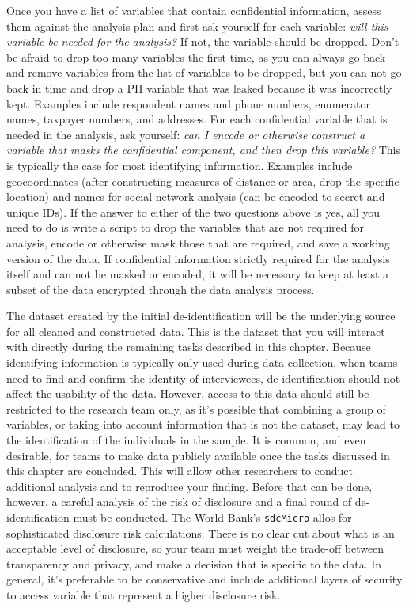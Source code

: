 Once you have a list of variables that contain confidential information,
assess them against the analysis plan and first ask yourself for each variable:
\textit{will this variable be needed for the analysis?}
If not, the variable should be dropped.
Don't be afraid to drop too many variables the first time,
as you can always go back and remove variables from the list of variables to be dropped,
but you can not go back in time and drop a PII variable that was leaked
because it was incorrectly kept.
Examples include respondent names and phone numbers, enumerator names, taxpayer 
numbers, and addresses.
For each confidential variable that is needed in the analysis, ask yourself:
\textit{can I encode or otherwise construct a variable that masks the confidential component, and
	then drop this variable?}
This is typically the case for most identifying information.
Examples include geocoordinates
(after constructing measures of distance or area,
drop the specific location)
and names for social network analysis (can be encoded to secret and unique IDs).
If the answer to either of the two questions above is yes,
all you need to do is write a script to drop the variables that are not required for analysis,
encode or otherwise mask those that are required,
and save a working version of the data.
If confidential information strictly required for the analysis itself and can not be
masked or encoded,
it will be necessary to keep at least a subset of the data encrypted through
the data analysis process.

The dataset created by the initial de-identification will be the underlying source for all cleaned and constructed data.
This is the dataset that you will interact with directly during the remaining tasks described in this chapter.
Because identifying information is typically only used during data collection,
when teams need to find and confirm the identity of interviewees,
de-identification should not affect the usability of the data.
However, access to this data should still be restricted to the research team only,
as it's possible that combining a group of variables,
or taking into account information that is not the dataset,
may lead to the identification of the individuals in the sample.
It is common, and even desirable, for teams to make data publicly available
once the tasks discussed in this chapter are concluded.
This will allow other researchers to conduct additional analysis and to reproduce your finding.
Before that can be done, however,
a careful analysis of the risk of disclosure and a final round of de-identification must be conducted.
The World Bank's \texttt{sdcMicro} allos for sophisticated disclosure risk calculations.
There is no clear cut about what is an acceptable level of disclosure,
so your team must weight the trade-off between transparency and privacy,
and make a decision that is specific to the data.
In general, it's preferable to be conservative and include additional layers of security
to access variable that represent a higher disclosure risk.


